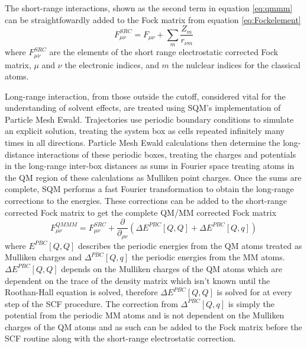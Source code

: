 The short-range interactions, shown as the second term in equation \ref{eq:qmmm} can be straightfowardly added to the Fock matrix from equation \ref{eq:Fockelement}
\begin{equation}
  F_{\mu\nu}^{SRC} = F_{\mu\nu} + \sum_{m} \frac{Z_{m}}{r_{\nu m}}
\end{equation}
where \(F_{\mu\nu}^{SRC}\) are the elements of the short range electrostatic corrected Fock matrix, \(\mu\) and \(\nu\) the electronic indices, and \(m\) the nulclear indices for the classical atoms.

Long-range interaction, from those outside the cutoff, considered vital for the understanding of solvent effects, are treated using SQM’s implementation of Particle Mesh Ewald.\cite{darden1993particle}
Trajectories use periodic boundary conditions to simulate an explicit solution, treating the system box as cells repeated infinitely many times in all directions.
Particle Mesh Ewald calculations then determine the long-distance interactions of these periodic boxes, treating the charges and potentials in the long-range inter-box distances as sums in Fourier space treating atoms in the QM region of these calculations as Mulliken point charges.\cite{essman1995smooth}
Once the sums are complete, SQM performs a fast Fourier transformation to obtain the long-range corrections to the energies.
These corrections can be added to the short-range corrected Fock matrix to get the complete QM/MM corrected Fock matrix
\begin{equation}
  F_{\mu\nu}^{QMMM} = F_{\mu\nu}^{SRC} + \frac{\partial}{\partial_{\rho\nu}}\left(\Delta E^{PBC}[Q,Q] + \Delta E^{PBC}[Q,q] \right)
\end{equation}
where \(E^{PBC}[Q,Q]\) describes the periodic energies from the QM atoms treated as Mulliken charges and \(\Delta^{PBC} [Q,q]\) the periodic energies from the MM atoms.
\(\Delta E^{PBC}[Q,Q]\) depends on the Mulliken charges of the QM atoms which are dependent on the trace of the density matrix which isn't known until the Roothan-Hall equation is solved, therefore \(\Delta E^{PBC}[Q,Q]\) is solved for at every step of the SCF procedure.
The correction from \(\Delta^{PBC} [Q,q]\) is simply the potential from the periodic MM atoms and is not dependent on the Mulliken charges of the QM atoms and as such can be added to the Fock matrix before the SCF routine along with the short-range electrostatic correction.

